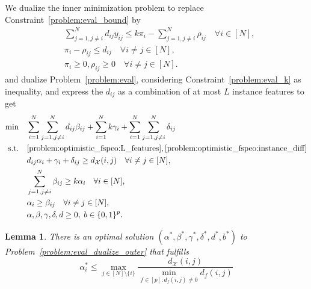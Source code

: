 \documentclass[10pt,a4paper]{amsart}
\newtheorem{lemma}{Lemma}
\newcommand{\FRil}[1]{\todo[color=black, textcolor=white, inline, author=FR]{#1}}
\newcommand{\X}{{\mathcal{X}}} %
\newcommand{\instanceindex}{i}
\newcommand{\instanceindextwo}{j}
\newcommand{\instfeatures}{[p]} %
\newcommand{\soldist}[1][(\instanceindex,\instanceindextwo)]{d_\X#1} %
\begin{document}
We dualize the inner minimization problem to replace Constraint~\eqref{problem:eval_bound} by
\begin{subequations}\label{problem:eval_dualize_inner}
	\begin{align}
		& \sum_{j=1, j\neq i}^N d_{ij}y_{ij} \leq k \pi_i - \sum_{j=1, j\neq i}^N \rho_{ij} \quad \forall i\in [N],\\
		&\pi_i - \rho_{ij} \leq d_{ij} \quad \forall i\neq j\in [N],\\
		& \pi_i \geq 0, \rho_{ij} \geq 0 \quad \forall i\neq j\in [N].
	\end{align}
\end{subequations}
and dualize Problem~\eqref{problem:eval}, considering Constraint~\eqref{problem:eval_k} as inequality, and express the $d_{ij}$ as a combination of at most $L$ instance features to get
\begin{subequations}\label{problem:eval_dualize_outer}
	\begin{align}
		\min \quad & \sum_{i=1}^N \sum_{j=1,j\neq i}^N d_{ij} \beta_{ij} + \sum_{i=1}^N k \gamma_i + \sum_{i=1}^N \sum_{j=1, j\neq i}^N \delta_{ij}\\
		\nonumber\text{s.t.} \quad & \eqref{problem:optimistic_fspeo:L_features}, \eqref{problem:optimistic_fspeo:instance_diff}\\
		\label{problem:eval_dualize_outer:b_cons}& d_{ij} \alpha_i + \gamma_i + \delta_{ij} \geq \soldist\quad \forall i\neq j\in [N],\\
		\label{problem:eval_dualize_outer:alpha_bound}& \sum_{j=1,j\neq i}^N \beta_{ij} \geq k \alpha_i \quad \forall i\in [N],\\
		\label{problem:eval_dualize_outer:beta_bound}& \alpha_i \geq \beta_{ij} \quad \forall i\neq j\in [N],\\
		&\alpha, \beta, \gamma, \delta, d \geq 0, \;b \in \{0, 1\}^{p}.
	\end{align}
\end{subequations}

\begin{lemma}\label{lemma:bound_on_alpha}
	There is an optimal solution $(\alpha^*, \beta^*, \gamma^*, \delta^*, d^*, b^*)$ to Problem~\eqref{problem:eval_dualize_outer} that fulfills
	\begin{equation}
		\label{alphabound}\alpha_i^* \leq \max_{j \in [N]\setminus\{i\}} \frac{\soldist}{\min_{f\in \instfeatures: d_f(i,j) \neq 0} d_f(i,j)}
	\end{equation}
\end{lemma}
\end{document}
